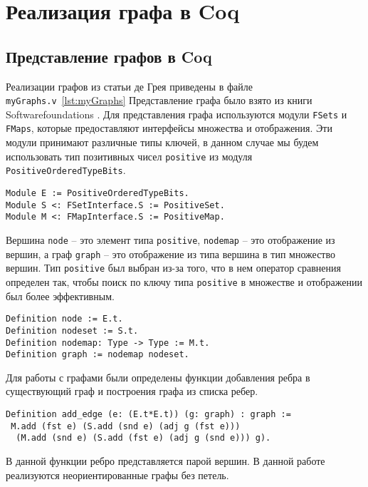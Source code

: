 

\chapter{Реализация графа в Coq}

\section{Представление графов в Coq}
Реализации графов из статьи де Грея приведены в файле {\tt myGraphs.v}~\ref{lst:myGraphs}
Представление графа было взято из книги Softwarefoundations \cite{VFA}.
Для представления графа используются модули {\tt FSets} и {\tt FMaps}, которые предоставляют интерфейсы множества и отображения. Эти модули принимают различные типы ключей, в данном случае мы будем использовать тип позитивных чисел {\tt positive} из модуля {\tt PositiveOrderedTypeBits}.

\begin{verbatim}
Module E := PositiveOrderedTypeBits.
Module S <: FSetInterface.S := PositiveSet.
Module M <: FMapInterface.S := PositiveMap.
\end{verbatim} 

Вершина {\tt node} -- это элемент типа {\tt positive}, {\tt nodemap} -- это отображение из вершин, а граф {\tt graph} -- это отображение из типа вершина в тип множество вершин. Тип {\tt positive} был выбран из-за того, что в нем оператор сравнения определен так, чтобы поиск по ключу типа {\tt positive} в множестве и отображении был более эффективным.

\begin{verbatim}
Definition node := E.t.
Definition nodeset := S.t.
Definition nodemap: Type -> Type := M.t.
Definition graph := nodemap nodeset.
\end{verbatim}

Для работы с графами были определены функции добавления ребра в существующий граф и построения графа из списка ребер.

\begin{verbatim}
Definition add_edge (e: (E.t*E.t)) (g: graph) : graph :=
 M.add (fst e) (S.add (snd e) (adj g (fst e))) 
  (M.add (snd e) (S.add (fst e) (adj g (snd e))) g).
\end{verbatim}

В данной функции ребро представляется парой вершин.
В данной работе реализуются неориентированные графы без петель.

